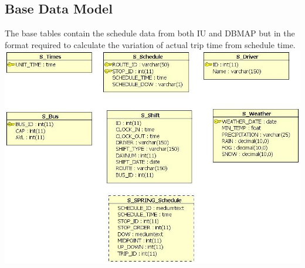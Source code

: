 \documentclass[12pt]{article}\usepackage[]{graphicx}\usepackage[]{color}
\begin{document}
\subsection{Base Data Model}
The base tables contain the schedule data from both IU and DBMAP but in the format required to calculate the variation of actual trip time from schedule time. \\
\includegraphics[scale=0.5]{resources/Source_spring}\\[1cm] 
\end{document}
